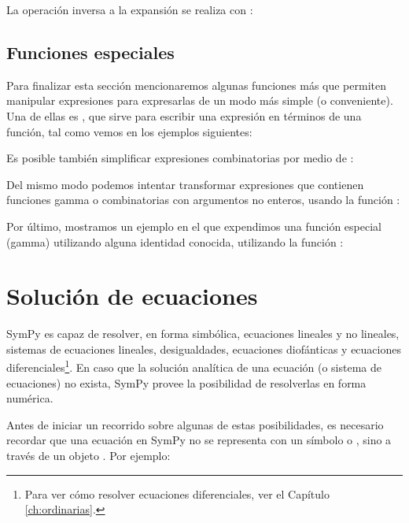 
La operación inversa a la expansión se realiza con :


\subsection{Funciones especiales}
Para finalizar esta sección mencionaremos algunas funciones más que permiten manipular expresiones para expresarlas de un modo más simple (o conveniente). Una de ellas es , que sirve para escribir una expresión en términos de una función, tal como vemos en los ejemplos siguientes:


Es posible también simplificar expresiones combinatorias por medio de :


Del mismo modo podemos intentar transformar expresiones que contienen funciones gamma o combinatorias con argumentos no enteros, usando la función :


Por último, mostramos un ejemplo en el que expendimos una función especial (gamma) utilizando alguna identidad conocida, utilizando la función :



\section{Solución de ecuaciones}

SymPy es capaz de resolver, en forma simbólica, ecuaciones lineales y no lineales, sistemas de ecuaciones lineales, desigualdades, ecuaciones diofánticas y ecuaciones diferenciales\footnote{Para ver cómo resolver ecuaciones diferenciales, ver el Capítulo \ref{ch:ordinarias}.}. En caso que la solución analítica de una ecuación (o sistema de ecuaciones) no exista, SymPy provee la posibilidad de resolverlas en forma numérica.

Antes de iniciar un recorrido sobre algunas de estas posibilidades, es necesario recordar que una ecuación en SymPy no se representa con un símbolo \mip{=} o \mip{==}, sino a través de un objeto . Por ejemplo:

